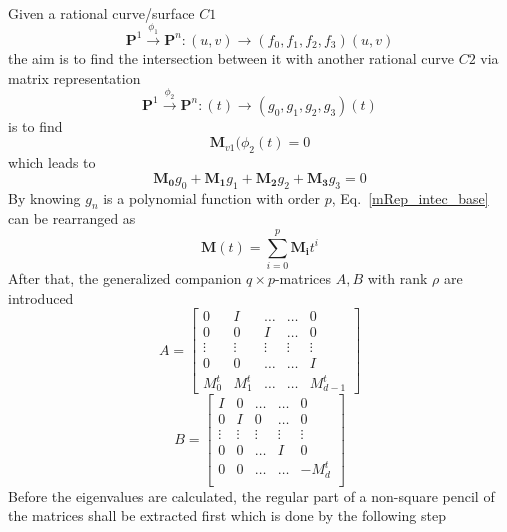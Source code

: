 \paragraph{} 
Given a rational curve/surface $C1$
\begin{equation}
    \mathbf{P}^1 \xrightarrow{\phi_1} \mathbf{P}^n: (u,v) \rightarrow(f_0,f_1,f_2,f_3)(u,v)
\end{equation}
%
the aim is to find the intersection between it with another rational curve $C2$ via matrix representation
\begin{equation}
    \mathbf{P}^1 \xrightarrow{\phi_2} \mathbf{P}^n: (t) \rightarrow(g_0,g_1,g_2,g_3)(t)
\end{equation}
%
is to find
\begin{equation}
    \mathbf{M}_{v1}(\phi_2(t) = 0
\end{equation}
%
which leads to
\begin{equation}
    \mathbf{M_0}g_0 + \mathbf{M_1}g_1 + \mathbf{M_2}g_2 + \mathbf{M_3}g_3 = 0
    \label{mRep_intec_base}
\end{equation}
%
By knowing $g_n$ is a polynomial function with order $p$, Eq.~\eqref{mRep_intec_base} can be rearranged as
\begin{equation}
    \mathbf{M}(t) = \sum_{i=0}^p \mathbf{M_i}t^i
\end{equation}
%
After that, the generalized companion $q \times p$-matrices $A, B$ with rank $\rho$ are introduced
\begin{equation}
    A = 
    \begin{bmatrix}
        0		&I 		&\dots 		&\dots 		&0 		\\
        0 		&0 		&I 			&\dots 		&0 		\\
        \vdots 	&\vdots &\vdots 	&\vdots 	&\vdots \\
        0 		&0 		&\dots		&\dots 		&I 		\\
        M_0^t 	&M_1^t 	&\dots 		&\dots 		&M_{d-1}^t
    \end{bmatrix}
\end{equation}
%
\begin{equation}
    B = 
    \begin{bmatrix}
        I 		&0 		&\dots 		&\dots 		&0 		\\
        0 		&I 		&0 			&\dots 		&0 		\\
        \vdots 	&\vdots &\vdots 	&\vdots 	&\vdots \\
        0 		&0 		&\dots 		&I 			&0 		\\
        0 		&0 		&\dots 		&\dots 		&-M_d^t \\		
    \end{bmatrix}
\end{equation}
%
Before the eigenvalues are calculated, the regular part of a non-square pencil of the matrices shall be extracted first which is done by the following step
%
